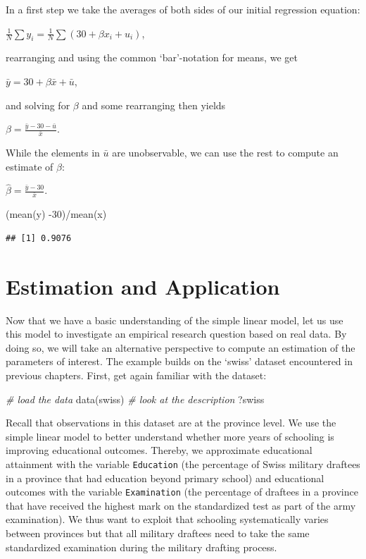 \documentclass[
  12pt,
]{style/krantz}
\newenvironment{Shaded}{\begin{snugshade}}{\end{snugshade}}
\newcommand{\CommentTok}[1]{\textcolor[rgb]{0.56,0.35,0.01}{\textit{#1}}}
\newcommand{\DecValTok}[1]{\textcolor[rgb]{0.00,0.00,0.81}{#1}}
\newcommand{\FunctionTok}[1]{\textcolor[rgb]{0.00,0.00,0.00}{#1}}
\newcommand{\NormalTok}[1]{#1}
\newcommand{\SpecialCharTok}[1]{\textcolor[rgb]{0.00,0.00,0.00}{#1}}
\begin{document}
In a first step we take the averages of both sides of our initial regression equation:

\(\frac{1}{N}\sum{y_i}=\frac{1}{N}\sum{(30 + \beta x_{i} + u_{i})}\),

rearranging and using the common `bar'-notation for means, we get

\(\bar{y}=30+\beta\bar{x} + \bar{u}\),

and solving for \(\beta\) and some rearranging then yields

\(\beta=\frac{\bar{y}-30-\bar{u}}{\bar{x}}\).

While the elements in \(\bar{u}\) are unobservable, we can use the rest to compute an estimate of \(\beta\):

\(\hat{\beta}=\frac{\bar{y}-30}{\bar{x}}\).

\begin{Shaded}
\begin{Highlighting}[]
\NormalTok{(}\FunctionTok{mean}\NormalTok{(y) }\SpecialCharTok{{-}}\DecValTok{30}\NormalTok{)}\SpecialCharTok{/}\FunctionTok{mean}\NormalTok{(x)}
\end{Highlighting}
\end{Shaded}

\begin{verbatim}
## [1] 0.9076
\end{verbatim}

\hypertarget{estimation-and-application}{%
\section{Estimation and Application}\label{estimation-and-application}}

Now that we have a basic understanding of the simple linear model, let us use this model to investigate an empirical research question based on real data. By doing so, we will take an alternative perspective to compute an estimation of the parameters of interest. The example builds on the `swiss' dataset encountered in previous chapters. First, get again familiar with the dataset:

\begin{Shaded}
\begin{Highlighting}[]
\CommentTok{\# load the data}
\FunctionTok{data}\NormalTok{(swiss)}
\CommentTok{\# look at the description}
\NormalTok{?swiss}
\end{Highlighting}
\end{Shaded}

Recall that observations in this dataset are at the province level. We use the simple linear model to better understand whether more years of schooling is improving educational outcomes. Thereby, we approximate educational attainment with the variable \texttt{Education} (the percentage of Swiss military draftees in a province that had education beyond primary school) and educational outcomes with the variable \texttt{Examination} (the percentage of draftees in a province that have received the highest mark on the standardized test as part of the army examination). We thus want to exploit that schooling systematically varies between provinces but that all military draftees need to take the same standardized examination during the military drafting process.
\end{document}
